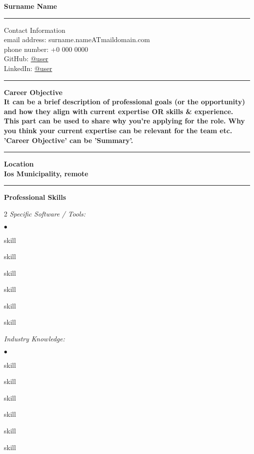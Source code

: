 \documentclass[oneside,final,10pt]{extreport}
\newenvironment{compactlist}{
	\begin{list}{{$\bullet$}}{
		\setlength\leftmargin{0.4cm}
		\setlength\partopsep{0pt}
		\setlength\parskip{0pt}
		\setlength\parsep{0pt}
		\setlength\topsep{0pt}
		\setlength\itemsep{0pt}
	}
}{
	\end{list}
}
\begin{document}
\bfseries
Surname Name \\
\rule{\textwidth}{0.4pt}
Contact Information \\
\noindent
\mdseries
email address: 
surname.nameATmaildomain.com \\
phone number: 
+0 000 0000 \\
GitHub:
\href{https://github.com/user}{@user} \\
LinkedIn:
\href{https://www.linkedin.com/in/username}{@user} \\
\rule{\textwidth}{0.4pt}

\bfseries
Career Objective \\
\mdseries
It can be a brief description of professional goals (or the opportunity) and how they align with current expertise OR skills \& experience. \\
This part can be used to share why you're applying for the role. Why you think your current expertise can be relevant for the team etc. \\
'Career Objective' can be 'Summary'. \\[5pt]
\rule{\textwidth}{0.4pt}

\bfseries
Location \\
\mdseries
Ios Municipality, remote \\
\rule{\textwidth}{0.4pt}

\bfseries
Professional Skills
\mdseries
	\begin{multicols}{2}
		\textsl{Specific Software / Tools:}
			\begin{compactlist}
				\item skill
				\item skill
				\item skill
				\item skill
				\item skill
				\item skill
			\end{compactlist}
		\textsl{Industry Knowledge:}
			\begin{compactlist}
				\item skill
				\item skill
				\item skill
				\item skill
				\item skill
				\item skill
			\end{compactlist}
	\end{multicols}
\end{document}

